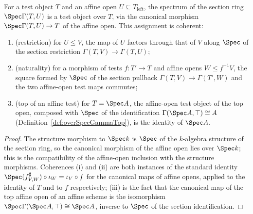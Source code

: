 \begin{definition}
  \label{def:fromSpecAffine}
  \leanok
  For a test object \(T\) and an affine open \(U \subseteq T_{\mathrm{left}}\), the spectrum
  of the section ring \(\Spec \Gamma(T, U)\) is a test object over \(T\), via the canonical
  morphism \(\Spec \Gamma(T,U) \to T\) of the affine open. This assignment is coherent:
  \begin{enumerate}
  \item (restriction) for \(U \le V\), the map of \(U\) factors through that of \(V\) along
    \(\Spec\) of the section restriction \(\Gamma(T,V) \to \Gamma(T,U)\);
  \item (naturality) for a morphism of tests \(f \colon T' \to T\) and affine opens
    \(W \le f^{-1}V\), the square formed by \(\Spec\) of the section pullback
    \(\Gamma(T,V) \to \Gamma(T',W)\) and the two affine-open test maps commutes;
  \item (top of an affine test) for \(T = \Spec A\), the affine-open test object of the top
    open, composed with \(\Spec\) of the identification \(\Gamma(\Spec A, \top) \cong A\)
    (Definition~\ref{def:overSpecGammaTop}), is the identity of \(\Spec A\).
  \end{enumerate}
\end{definition}
\begin{proof}
  \leanok
  The structure morphism to \(\Spec k\) is \(\Spec\) of the \(k\)-algebra structure of the
  section ring, so the canonical morphism of the affine open lies over \(\Spec k\); this is
  the compatibility of the affine-open inclusion with the structure morphisms. Coherences (i)
  and (ii) are both instances of the standard identity
  \(\Spec(f^{\sharp}_{V,W}) \circ \iota_W = \iota_V \circ f\) for the canonical maps of
  affine opens, applied to the identity of \(T\) and to \(f\) respectively; (iii) is the
  fact that the canonical map of the top affine open of an affine scheme is the isomorphism
  \(\Spec \Gamma(\Spec A, \top) \cong \Spec A\), inverse to \(\Spec\) of the section
  identification.
\end{proof}

